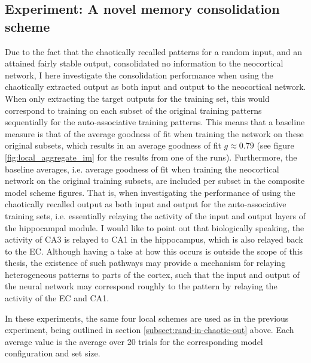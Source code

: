 \subsection{Experiment: A novel memory consolidation scheme} %

Due to the fact that the chaotically recalled patterns for a random input, and an attained fairly stable output, consolidated no information to the neocortical network, I here investigate the consolidation performance when using the chaotically extracted output as both input and output to the neocortical network. When only extracting the target outputs for the training set, this would correspond to training on each subset of the original training patterns sequentially for the auto-associative training patterns. This means that a baseline measure is that of the average goodness of fit when training the network on these original subsets, which results in an average goodness of fit $g \approx 0.79$ (see figure \ref{fig:local_aggregate_im} for the results from one of the runs). Furthermore, the baseline averages, i.e. average goodness of fit when training the neocortical network on the original training subsets, are included per subset in the composite model scheme figures. That is, when investigating the performance of using the chaotically recalled output as both input and output for the auto-associative training sets, i.e. essentially relaying the activity of the input and output layers of the hippocampal module.
I would like to point out that biologically speaking, the activity of CA3 is relayed to CA1 in the hippocampus, which is also relayed back to the EC. Although having a take at how this occurs is outside the scope of this thesis, the existence of such pathways may provide a mechanism for relaying heterogeneous patterns to parts of the cortex, such that the input and output of the neural network may correspond roughly to the pattern by relaying the activity of the EC and CA1.

In these experiments, the same four local schemes are used as in the previous experiment, being outlined in section \ref{subsect:rand-in-chaotic-out} above. Each average value is the average over 20 trials for the corresponding model configuration and set size.


